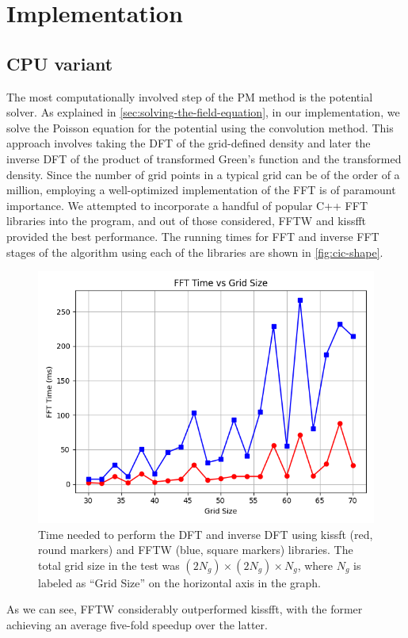 \section{Implementation}
\subsection{CPU variant}
The most computationally involved step of the PM method is the potential solver.
As explained in \autoref{sec:solving-the-field-equation}, in our implementation, we solve the Poisson equation for the potential using the convolution method.
This approach involves taking the DFT of the grid-defined density and later the inverse DFT of the product of transformed Green's function and the transformed density.
Since the number of grid points in a typical grid can be of the order of a million, employing a well-optimized implementation of the FFT is of paramount importance.
We attempted to incorporate a handful of popular C++ FFT libraries into the program, and out of those considered, FFTW \cite{FFTW05} and kissfft \cite{kissfft} provided the best performance.
The running times for FFT and inverse FFT stages of the algorithm using each of the libraries are shown in \autoref{fig:cic-shape}.
\begin{figure}[htp]
    \centering
    \includegraphics[scale=0.5]{chapters/pm-method/img/fft_time.png}
    \caption{Time needed to perform the DFT and inverse DFT using kissft (red, round markers) and FFTW (blue, square markers) libraries.
        The total grid size in the test was $(2N_g)\times (2N_g) \times N_g$, where $N_g$ is labeled as ``Grid Size'' on the horizontal axis in the graph.}
    \label{fig:fft-time}
\end{figure}
As we can see, FFTW considerably outperformed kissfft, with the former achieving an average five-fold speedup over the latter.

